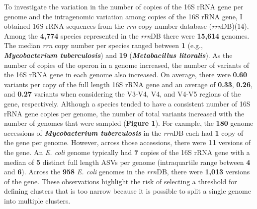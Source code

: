 \documentclass[
]{article}
\begin{document}
To investigate the variation in the number of copies of the 16S rRNA
gene per genome and the intragenomic variation among copies of the 16S
rRNA gene, I obtained 16S rRNA sequences from the \emph{rrn} copy number
database (\emph{rrn}DB)(14). Among the \textbf{4,774} species
represented in the \emph{rrn}DB there were \textbf{15,614} genomes. The
median \emph{rrn} copy number per species ranged between \textbf{1}
(e.g., \textbf{\emph{Mycobacterium tuberculosis}}) and \textbf{19}
(\textbf{\emph{Metabacillus litoralis}}). As the number of copies of the
operon in a genome increased, the number of variants of the 16S rRNA
gene in each genome also increased. On average, there were \textbf{0.60}
variants per copy of the full length 16S rRNA gene and an average of
\textbf{0.33}, \textbf{0.26}, and \textbf{0.27} variants when
considering the V3-V4, V4, and V4-V5 regions of the gene, respectively.
Although a species tended to have a consistent number of 16S rRNA gene
copies per genome, the number of total variants increased with the
number of genomes that were sampled (\textbf{Figure 1}). For example,
the \textbf{180} genome accessions of \textbf{\emph{Mycobacterium
tuberculosis}} in the \emph{rrn}DB each had \textbf{1} copy of the gene
per genome. However, across those accessions, there were \textbf{11}
versions of the gene. An \emph{E. coli} genome typically had \textbf{7}
copies of the 16S rRNA gene with a median of \textbf{5} distinct full
length ASVs per genome (intraquartile range between \textbf{4} and
\textbf{6}). Across the \textbf{958} \emph{E. coli} genomes in the
\emph{rrn}DB, there were \textbf{1,013} versions of the gene. These
observations highlight the risk of selecting a threshold for defining
clusters that is too narrow because it is possible to split a single
genome into multiple clusters.
\end{document}
